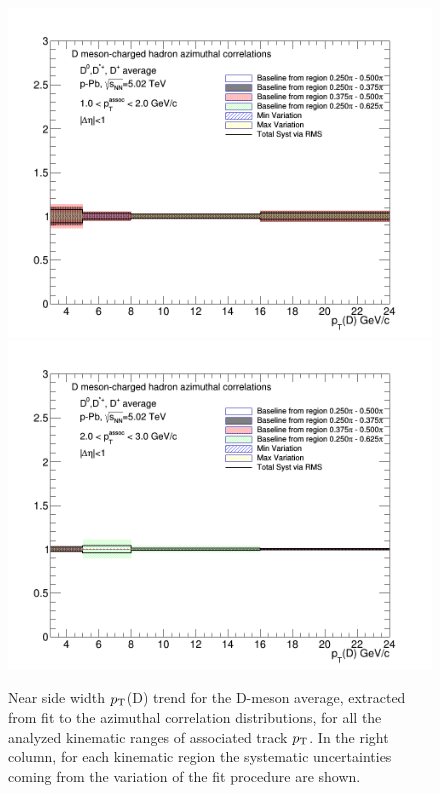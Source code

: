 \begin{figure}[!htbp]
{\includegraphics[width=0.49\linewidth, height=0.33\linewidth]{figures/FitOutput/BaselineSystematicSourcesNSSigma_pthad1dotto2dot.png}}
{\includegraphics[width=0.49\linewidth, height=0.33\linewidth]{figures/FitOutput/BaselineSystematicSourcesNSSigma_pthad2dotto3dot.png}}
\caption{Near side width $p_{\rm T}$(D) trend for the D-meson average, extracted from fit to the azimuthal correlation distributions, for all the analyzed kinematic ranges of associated track $p_{\rm T}$. In the right column, for each kinematic region the systematic uncertainties coming from the variation of the fit procedure are shown.}
\label{fig:nearsidesigmaAverage}
\end{figure}

